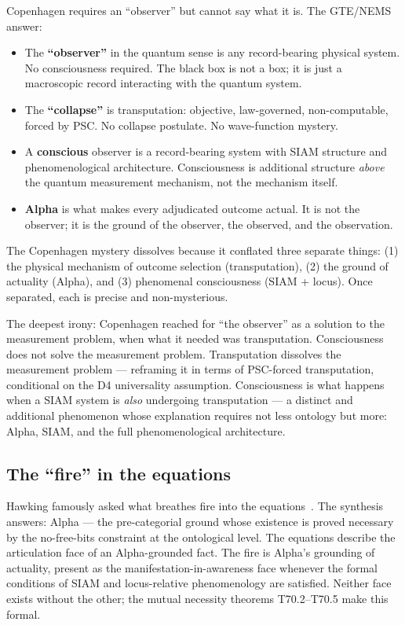 \documentclass[11pt]{article}
\theoremstyle{remark}
\begin{document}
\begin{tcolorbox}[colback=orange!5,colframe=orange!60!black,
  title={Copenhagen's black box is not empty --- it is mislabeled}]
Copenhagen requires an ``observer'' but cannot say what it is. The GTE/NEMS answer:
\begin{itemize}
  \item The \textbf{``observer''} in the quantum sense is any record-bearing physical
    system. No consciousness required. The black box is not a box; it is just a
    macroscopic record interacting with the quantum system.
  \item The \textbf{``collapse''} is transputation: objective, law-governed, non-computable,
    forced by PSC. No collapse postulate. No wave-function mystery.
  \item A \textbf{conscious} observer is a record-bearing system with SIAM structure
    and phenomenological architecture. Consciousness is additional structure \emph{above}
    the quantum measurement mechanism, not the mechanism itself.
  \item \textbf{Alpha} is what makes every adjudicated outcome actual. It is not the
    observer; it is the ground of the observer, the observed, and the observation.
\end{itemize}
The Copenhagen mystery dissolves because it conflated three separate things: (1) the
physical mechanism of outcome selection (transputation), (2) the ground of actuality
(Alpha), and (3) phenomenal consciousness (SIAM + locus). Once separated, each is
precise and non-mysterious.
\end{tcolorbox}

The deepest irony: Copenhagen reached for ``the observer'' as a solution to the
measurement problem, when what it needed was transputation. Consciousness does not
solve the measurement problem. Transputation dissolves the measurement problem ---
reframing it in terms of PSC-forced transputation, conditional on the D4 universality
assumption.
Consciousness is what happens when a SIAM system is \emph{also} undergoing
transputation --- a distinct and additional phenomenon whose explanation requires
not less ontology but more: Alpha, SIAM, and the full phenomenological architecture.

\subsection{The ``fire'' in the equations}

Hawking famously asked what breathes fire into the equations~\cite{hawking1988}.
The synthesis answers: Alpha --- the pre-categorial ground whose existence is proved
necessary by the no-free-bits constraint at the ontological level. The equations
describe the articulation face of an Alpha-grounded fact. The fire is Alpha's
grounding of actuality, present as the manifestation-in-awareness face whenever the
formal conditions of SIAM and locus-relative phenomenology are satisfied. Neither
face exists without the other; the mutual necessity theorems T70.2--T70.5 make this
formal.
\end{document}
